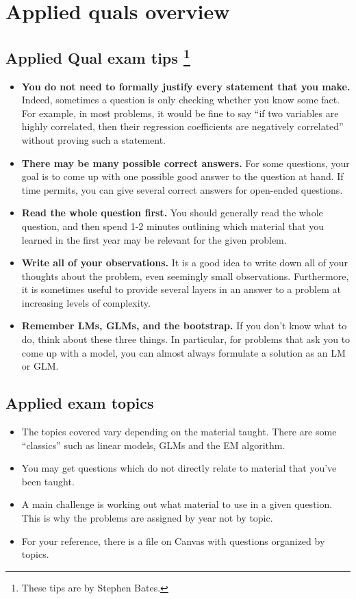 \section{Applied quals overview}
\subsection{Applied Qual exam tips \footnote{These tips are by Stephen Bates.}}


\begin{itemize}
	\item \textbf{You do not need to formally justify every statement that you make.} Indeed, sometimes a question is only
checking whether you know some fact. For example, in most problems, it would be
fine to say ``if two variables are highly correlated, then their regression coefficients
are negatively correlated'' without proving such a statement.
	\item \textbf{There may be many possible correct answers.} For some questions, your goal is to come up with one possible good answer to the question at hand. If time permits, you can give several correct answers for open-ended questions.
	\item \textbf{Read the whole question first.} You should generally read the whole question, and then spend 1-2 minutes outlining which material that you learned in
the first year may be relevant for the given problem.
	\item \textbf{Write all of your observations.} It is a good idea to write down all of your
thoughts about the problem, even seemingly small observations. Furthermore,
it is sometimes useful to provide several layers in an answer to a problem at increasing
levels of complexity. 
	\item \textbf{Remember LMs, GLMs, and the bootstrap.} If you don’t know what to
do, think about these three things. In particular, for problems that ask you to
come up with a model, you can almost always formulate a solution as an LM
or GLM.
\end{itemize}

\subsection{Applied exam topics}

\begin{itemize}
	\item The topics covered vary depending on the material taught. There are some ``classics'' such as linear models, GLMs and the EM algorithm.
	\item You may get questions which do not directly relate to material that you've been taught.
	\item A main challenge is working out what material to use in a given question. This is why the problems are assigned by year not by topic. 
	\item For your reference, there is a file on Canvas with questions organized by topics. 
\end{itemize}


